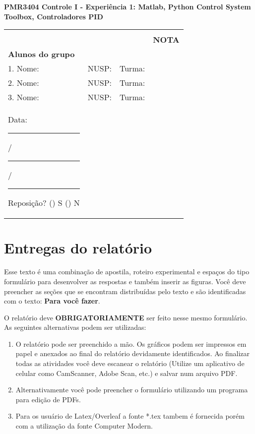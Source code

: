 \documentclass[10pt]{article}
\newcommand{\single}{\footnotesize\renewcommand{\baselinestretch}{0.90}\normalsize}
\theoremstyle{plain}
\begin{document}
\vspace*{-1cm}

\begin{center}
	{\bfseries\Large PMR3404 Controle I - Experiência 1:
		             Matlab, Python Control System Toolbox, Controladores PID}
\end{center}	

\begin{center}
\begin{tabular}{| p{9cm}  p{2.5cm}  p{1.7cm}| M{2.5cm} |} \hline &&& \\
	& & & {\bf NOTA} \\ [0pt]
	{\bf Alunos do grupo} & & & \\ [5pt]
	1. Nome: \hrulefill & NUSP: \hrulefill & Turma: \hrulefill &  \\ [10pt]
	2. Nome: \hrulefill & NUSP: \hrulefill & Turma: \hrulefill &  \\ [10pt]
	3. Nome: \hrulefill & NUSP: \hrulefill & Turma: \hrulefill &  \\ [10pt] 
	Data: \rule{4mm}{0.5pt} /\rule{4mm}{0.5pt} /\rule{4mm}{0.5pt} \hspace*{20pt} Reposição? (\;\;\;) S (\;\;\;) N & & & \\ [10pt] \hline
\end{tabular}
\end{center}

\single
\setlength{\parskip}{2pt}

\section{Entregas do relatório}

Esse texto é uma combinação de apostila, roteiro experimental e espaços
do tipo formulário para desenvolver as respostas e também inserir as figuras.
Você deve preencher as seções que se encontram distribuídas pelo texto e são identificadas com o texto:
{\bf Para você fazer}.


O relatório deve {\bf OBRIGATORIAMENTE} ser feito nesse mesmo formulário. As seguintes alternativas podem
ser utilizadas:
\begin{enumerate}
\item O relatório pode ser preenchido a mão. Os gráficos podem ser impressos em papel e anexados
      ao final do relatório devidamente identificados.
      Ao finalizar todas as atividades você deve escanear o relatório (Utilize um aplicativo de celular como CamScanner, Adobe Scan, etc.) e salvar num arquivo PDF.
\item Alternativamente você pode preencher o formulário utilizando um programa para edição de PDFs.
\item Para os usuário de Latex/Overleaf a fonte *.tex tambem é fornecida porém com a utilização da fonte
      Computer Modern.
\end{enumerate}
\end{document}
